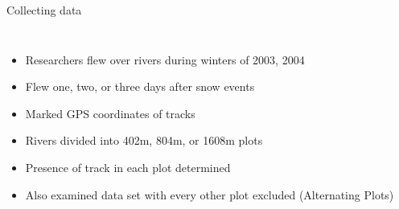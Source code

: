 \documentclass{beamer}
\begin{document}
\begin{frame}{Collecting data}
	\begin{columns}
		\column{5cm}
		\column{5cm}
		\begin{itemize}[<+->]
			\item Researchers flew over rivers during winters of 2003, 2004
			\item Flew one, two, or three days after snow events
			\item Marked GPS coordinates of tracks
			\item Rivers divided into 402m, 804m, or 1608m plots
			\item Presence of track in each plot determined
			\item Also examined data set with every other plot excluded
			(Alternating Plots)
		\end{itemize}
	\end{columns}
\end{frame}

{
	\begin{frame}{}
	\end{frame}
}
\end{document}
